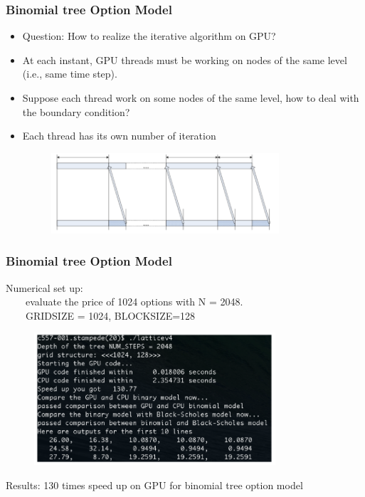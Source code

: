 \documentclass[xcolor={x11names,svgnames,dvipsnames}]{beamer}
\begin{document}
\begin{frame}
\frametitle{Binomial tree Option Model}
\begin{itemize}
\item Question: How to realize the iterative algorithm on GPU?
\item At each instant, GPU threads must be working on nodes of the
same level (i.e., same time step).
\item Suppose each thread work on some nodes of the same level,
how to deal with the boundary condition?
\item Each thread has its own number of iteration
 \begin{figure}
     \includegraphics[width=0.8\textwidth, height=0.4\textheight]{split.png}
\end{figure}
\end{itemize}
\end{frame}


\begin{frame}
\frametitle{Binomial tree Option Model}
Numerical set up:\\ 
\ \ \ \ evaluate the price of 1024 options with N = 2048.\\
\ \ \ \ GRIDSIZE = 1024, BLOCKSIZE=128

 \begin{figure}
     \includegraphics[width=0.8\textwidth, height=0.6\textheight]{binomial.png}
\end{figure}

Results: \alert{130 times} speed up on GPU for binomial tree option model

\end{frame}
\end{document}
